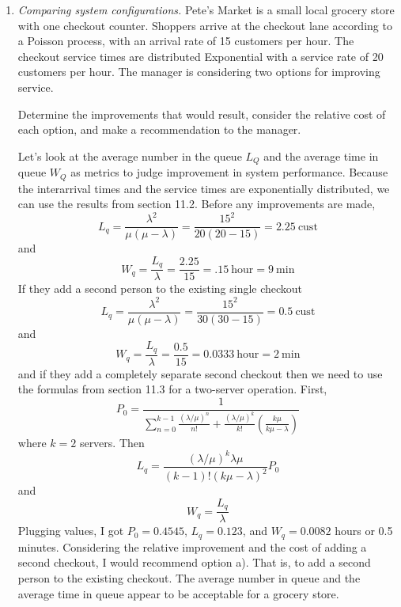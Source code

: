 \begin{enumerate}
\item \emph{Comparing system configurations.}
  Pete's Market is a small local grocery store with one checkout counter.
  Shoppers arrive at the checkout lane according to a Poisson process,
  with an arrival rate of 15 customers per hour. The checkout service times
  are distributed Exponential with a service rate of 20 customers per hour.
  The manager is considering two options for improving service.
  Determine the improvements that would result, consider the
  relative cost of each option, and make a recommendation to the manager.

\begin{solution}
\bs Let's look at the average number in the queue $L_Q$ and the
average time in queue $W_Q$ as metrics to judge improvement in
system performance. Because the interarrival times and the service
times are exponentially distributed, we can use the results from
section 11.2. Before any improvements are made,
\[ L_q = \frac{\lambda^2}{\mu(\mu-\lambda)} = \frac{15^2}{20(20-15)} = 2.25~\text{cust} \]
and
\[W_q = \frac{L_q}{\lambda} = \frac{2.25}{15} = .15~\text{hour} = 9~\text{min} \]
If they add a second person to the existing single checkout
\[ L_q = \frac{\lambda^2}{\mu(\mu-\lambda)} = \frac{15^2}{30(30-15)} = 0.5~\text{cust} \]
and
\[W_q = \frac{L_q}{\lambda} = \frac{0.5}{15} = 0.0333~\text{hour} = 2~\text{min} \]
and if they add a completely separate second checkout then we
need to use the formulas from section 11.3 for a two-server operation. First,
\[ P_0 = \frac{1}{\sum_{n=0}^{k-1}\frac{\left(\lambda/\mu\right)^n}{n!} + \frac{\left(\lambda/\mu\right)^k}{k!}\left(\frac{k\mu}{k\mu-\lambda}\right)} \]
where $k=2$ servers. Then
\[ L_q = \frac{\left(\lambda/\mu\right)^k\lambda\mu}{(k-1)!(k\mu-\lambda)^2}P_0 \]
and
\[W_q = \frac{L_q}{\lambda}  \]
Plugging values, I got $P_0=0.4545$, $L_q=0.123$, and $W_q=0.0082$ hours or 0.5 minutes.
Considering the relative improvement and the cost
of adding a second checkout, I would recommend option a). That is, to
add a second person to the existing checkout. The average number in
queue and the average time in queue appear to be acceptable for a
grocery store.
\end{solution}


\end{enumerate}
